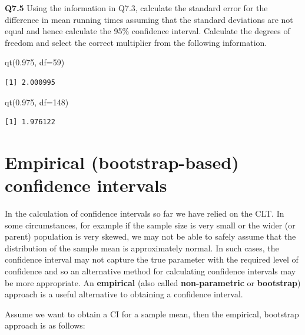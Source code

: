 \documentclass[
  oneside]{krantz}
\newenvironment{Shaded}{\begin{snugshade}}{\end{snugshade}}
\newcommand{\AttributeTok}[1]{\textcolor[rgb]{0.77,0.63,0.00}{#1}}
\newcommand{\DecValTok}[1]{\textcolor[rgb]{0.00,0.00,0.81}{#1}}
\newcommand{\FloatTok}[1]{\textcolor[rgb]{0.00,0.00,0.81}{#1}}
\newcommand{\FunctionTok}[1]{\textcolor[rgb]{0.00,0.00,0.00}{#1}}
\newcommand{\NormalTok}[1]{#1}
\begin{document}
\textbf{Q7.5} Using the information in Q7.3, calculate the standard error for the difference in mean running times assuming that the standard deviations are not equal and hence calculate the 95\% confidence interval. Calculate the degrees of freedom and select the correct multiplier from the following information.

\begin{Shaded}
\begin{Highlighting}[]
\FunctionTok{qt}\NormalTok{(}\FloatTok{0.975}\NormalTok{, }\AttributeTok{df=}\DecValTok{59}\NormalTok{)}
\end{Highlighting}
\end{Shaded}

\begin{verbatim}
[1] 2.000995
\end{verbatim}

\begin{Shaded}
\begin{Highlighting}[]
\FunctionTok{qt}\NormalTok{(}\FloatTok{0.975}\NormalTok{, }\AttributeTok{df=}\DecValTok{148}\NormalTok{)}
\end{Highlighting}
\end{Shaded}

\begin{verbatim}
[1] 1.976122
\end{verbatim}

\hypertarget{empirical-bootstrap-based-confidence-intervals}{%
\section{Empirical (bootstrap-based) confidence intervals}\label{empirical-bootstrap-based-confidence-intervals}}

In the calculation of confidence intervals so far we have relied on the CLT. In some circumstances, for example if the sample size is very small or the wider (or parent) population is very skewed, we may not be able to safely assume that the distribution of the sample mean is approximately normal. In such cases, the confidence interval may not capture the true parameter with the required level of confidence and so an alternative method for calculating confidence intervals may be more appropriate. An \textbf{empirical} (also called \textbf{non-parametric} or \textbf{bootstrap}) approach is a useful alternative to obtaining a confidence interval.

Assume we want to obtain a CI for a sample mean, then the empirical, bootstrap approach is as follows:
\end{document}
